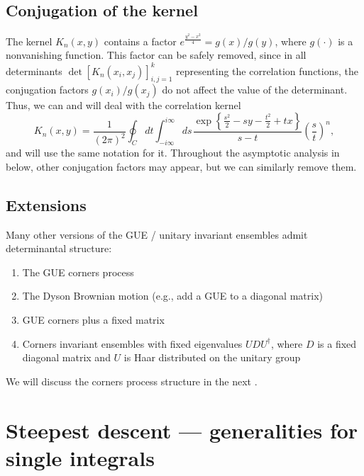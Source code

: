 \documentclass[letterpaper,11pt,oneside,reqno]{book}
\numberwithin{equation}{chapter}  %
\newcommand{\ssp}{\hspace{1pt}}
\theoremstyle{definition}
\begin{document}
\subsection{Conjugation of the kernel}

The kernel $K_n(x,y)$ contains a factor $e^{\frac{y^2-x^2}{4}}=g(x)/g(y)$,
where $g(\cdot)$ is a nonvanishing function. This factor can be safely removed, since
in all determinants
$\det[K_n(x_i,x_j)]_{i,j=1}^k$
representing the correlation functions, the
conjugation factors $g(x_i)/g(x_j)$ do not affect the value of the determinant.
Thus, we can and will deal with the correlation kernel
\begin{equation}
	\label{lecture6:eq:K_n_conjugated}
	K_n(x,y)=\frac{1}{(2\pi)^2}
	\oint_C dt\int_{-i\infty}^{i\infty}ds\ssp
	\frac{\exp\left\{ \frac{s^2}{2}-sy-\frac{t^2}{2}+tx \right\}}{s-t}\left( \frac{s}{t} \right)^n
	,
\end{equation}
and will use the same notation for it.
Throughout the asymptotic analysis in  below,
other conjugation factors may appear, but we can similarly
remove them.

\subsection{Extensions}

Many other versions of the GUE / unitary invariant ensembles admit determinantal structure:
\begin{enumerate}
	\item The GUE corners process \cite{johansson2006eigenvalues}
    \item The Dyson Brownian motion (e.g., add a GUE to a diagonal matrix)
			\cite{nagao1998multilevel}
		\item GUE corners plus a fixed matrix \cite{Ferrari2014PerturbedGUE}
    \item Corners invariant ensembles with fixed eigenvalues $UDU^\dagger$, where $D$ is a fixed diagonal matrix and $U$ is Haar distributed
			on the unitary group \cite{Metcalfe2011GT}
	\end{enumerate}

We will discuss the corners process structure
in the next
.


\section{Steepest descent --- generalities for single integrals}
\end{document}
